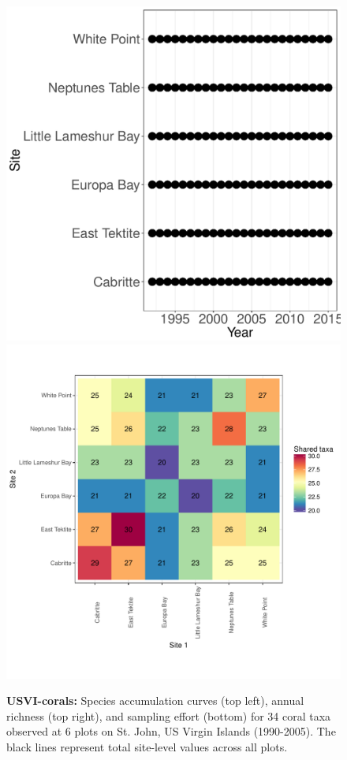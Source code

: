 \documentclass[11pt, oneside]{article}
\begin{document}
\begin{figure}[h!]
\includegraphics[scale = 0.4]{usvi-coral-castorani_spatiotemporal_sampling_effort.pdf}
\includegraphics[scale = 0.4]{usvi-coral-castorani_spp_shared.pdf}
\caption{{\bf USVI-corals:} Species accumulation curves (top left),  annual richness (top right), and sampling effort (bottom)  for 34 coral taxa observed at 6 plots on St. John, US Virgin Islands (1990-2005). The black lines represent total site-level values across all plots.}
\label{usvi-coral}
\end{figure}
\end{document}
